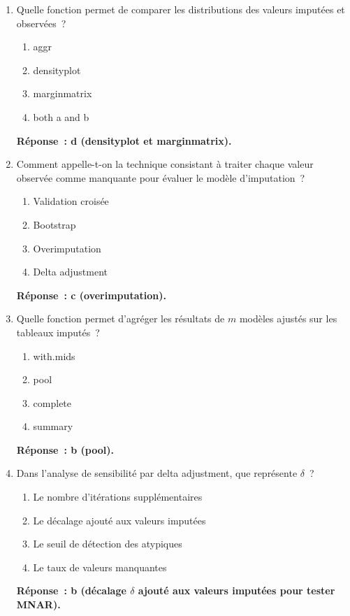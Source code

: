 \documentclass[a4paper,11pt]{article}
\theoremstyle{definition}
\theoremstyle{remark}
\begin{document}
\begin{enumerate}
  \item Quelle fonction permet de comparer les distributions des
    valeurs imput\'ees et observ\'ees~?
    \begin{enumerate}
      \item aggr
      \item densityplot
      \item marginmatrix
      \item both a and b
    \end{enumerate}
    \textbf{R\'eponse~: d (densityplot et marginmatrix).}

  \item Comment appelle-t-on la technique consistant \`a traiter
    chaque valeur observ\'ee comme manquante pour \'evaluer le
    mod\`ele d'imputation~?
    \begin{enumerate}
      \item Validation crois\'ee
      \item Bootstrap
      \item Overimputation
      \item Delta adjustment
    \end{enumerate}
    \textbf{R\'eponse~: c (overimputation).}

  \item Quelle fonction permet d'agr\'eger les r\'esultats de $m$
    mod\`eles ajust\'es sur les tableaux imput\'es~?
    \begin{enumerate}
      \item with.mids
      \item pool
      \item complete
      \item summary
    \end{enumerate}
    \textbf{R\'eponse~: b (pool).}

  \item Dans l'analyse de sensibilit\'e par delta adjustment, que
    repr\'esente $\delta$~?
    \begin{enumerate}
      \item Le nombre d'it\'erations suppl\'ementaires
      \item Le d\'ecalage ajout\'e aux valeurs imput\'ees
      \item Le seuil de d\'etection des atypiques
      \item Le taux de valeurs manquantes
    \end{enumerate}
    \textbf{R\'eponse~: b (d\'ecalage $\delta$ ajout\'e aux valeurs
    imput\'ees pour tester MNAR).}


\end{enumerate}
\end{document}
